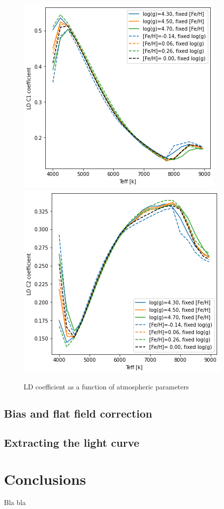 \documentclass[a4paper,11pt,twocolumn]{article}
\begin{document}
\begin{figure}[H]
    \centering  
    \includegraphics[scale=0.25, angle=0]{../pictures/Claret2017/2017_c1}
    \includegraphics[scale=0.25, angle=0]{../pictures/Claret2017/2017_c2}
    \caption{LD coefficient as a function of atmospheric parameters}
\end{figure}


\subsection{Bias and flat field correction}

\subsection{Extracting the light curve}


\section{Conclusions}

Bla bla




\printbibliography
\end{document}
